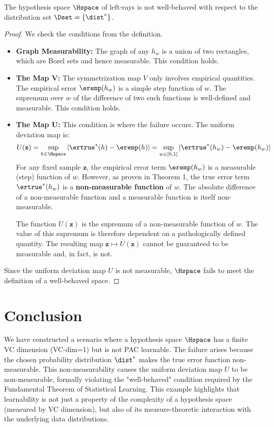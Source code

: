 \begin{corollary}
    The hypothesis space $\Hspace$ of left-rays is not well-behaved with respect to the distribution set $\Dset = \{\dist^*\}$.
\end{corollary}
\begin{proof}
    We check the conditions from the definition.
    \begin{itemize}
        \item \textbf{Graph Measurability:} The graph of any $h_w$ is a union of two rectangles, which are Borel sets and hence measurable. This condition holds.
        \item \textbf{The Map V:} The symmetrization map $V$ only involves empirical quantities. The empirical error $\eremp(h_w)$ is a simple step function of $w$. The supremum over $w$ of the difference of two such functions is well-defined and measurable. This condition holds.
        \item \textbf{The Map U:} This condition is where the failure occurs. The uniform deviation map is:
        \[ U(\mathbf{z}) = \sup_{h \in \Hspace} |\ertrue^*(h) - \eremp(h)| = \sup_{w \in [0, 1]} |\ertrue^*(h_w) - \eremp(h_w)| \]
        For any fixed sample $\mathbf{z}$, the empirical error term $\eremp(h_w)$ is a measurable (step) function of $w$. However, as proven in Theorem 1, the true error term $\ertrue^*(h_w)$ is a \textbf{non-measurable function} of $w$. The absolute difference of a non-measurable function and a measurable function is itself non-measurable.

        The function $U(\mathbf{z})$ is the supremum of a non-measurable function of $w$. The value of this supremum is therefore dependent on a pathologically defined quantity. The resulting map $\mathbf{z} \mapsto U(\mathbf{z})$ cannot be guaranteed to be measurable and, in fact, is not.
    \end{itemize}
    Since the uniform deviation map $U$ is not measurable, $\Hspace$ fails to meet the definition of a well-behaved space.
\end{proof}

\section{Conclusion}
We have constructed a scenario where a hypothesis space $\Hspace$ has a finite VC dimension (VC-dim=1) but is not PAC learnable. The failure arises because the chosen probability distribution $\dist^*$ makes the true error function non-measurable. This non-measurability causes the uniform deviation map $U$ to be non-measurable, formally violating the "well-behaved" condition required by the Fundamental Theorem of Statistical Learning. This example highlights that learnability is not just a property of the complexity of a hypothesis space (measured by VC dimension), but also of its measure-theoretic interaction with the underlying data distributions.